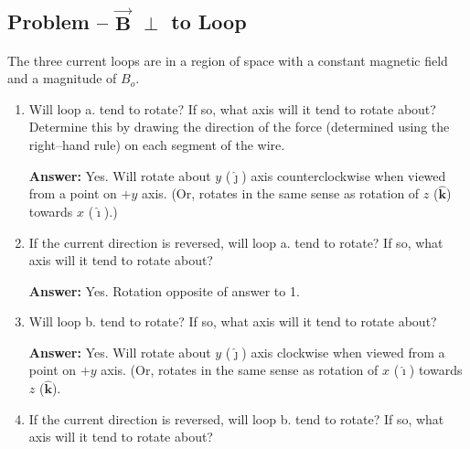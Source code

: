 \documentclass{article}
\newcommand{\ihat}[0]{\hat{\boldsymbol{\imath}}}
\newcommand{\jhat}[0]{\hat{\boldsymbol{\jmath}}}
\newcommand{\khat}[0]{\hat{\boldsymbol{k}}}
\newcommand{\bfvec}[1]{\vec{\mathbf{#1}}}
\begin{document}


\newpage

\subsection{Problem -- $\bfvec{B}$ $\perp$ to Loop}

\ifsolutions


\else


\fi
\ifsolutions\else

\fi

The three current loops are in a region of space with a constant magnetic field and a magnitude of $B_o$.

\begin{enumerate}

  \item Will loop a. tend to rotate? If so, what axis will it tend to rotate about? Determine this by drawing the direction of the force (determined using the right--hand rule) on each segment of the wire.

        \ifsolutions
        {\bf Answer: }Yes. Will rotate about $y$ ($\jhat$) axis counterclockwise when viewed from a point on $+y$ axis. (Or, rotates in the same sense as rotation of $z$ ($\khat$) towards $x$ ($\ihat$).)
        \else
        \vskip 56.25pt
        \fi
        \ifsolutions\else
        \vskip 56.25pt
        \fi

  \item If the current direction is reversed, will loop a. tend to rotate? If so, what axis will it tend to rotate about?

        \ifsolutions
        {\bf Answer: } Yes. Rotation opposite of answer to 1.
        \else
        \vskip 56.25pt
        \fi
        \ifsolutions\else
        \vskip 56.25pt
        \fi

  \item Will loop b. tend to rotate? If so, what axis will it tend to rotate about?

        \ifsolutions
        {\bf Answer:} Yes. Will rotate about $y$ ($\jhat$) axis clockwise when viewed from a point on $+y$ axis. (Or, rotates in the same sense as rotation of $x$ ($\ihat$) towards $z$ ($\khat$).
        \else
        \vskip 56.25pt
        \fi
        \ifsolutions\else
        \vskip 56.25pt
        \fi

  \item If the current direction is reversed, will loop b. tend to rotate? If so, what axis will it tend to rotate about?


\end{enumerate}
\end{document}
